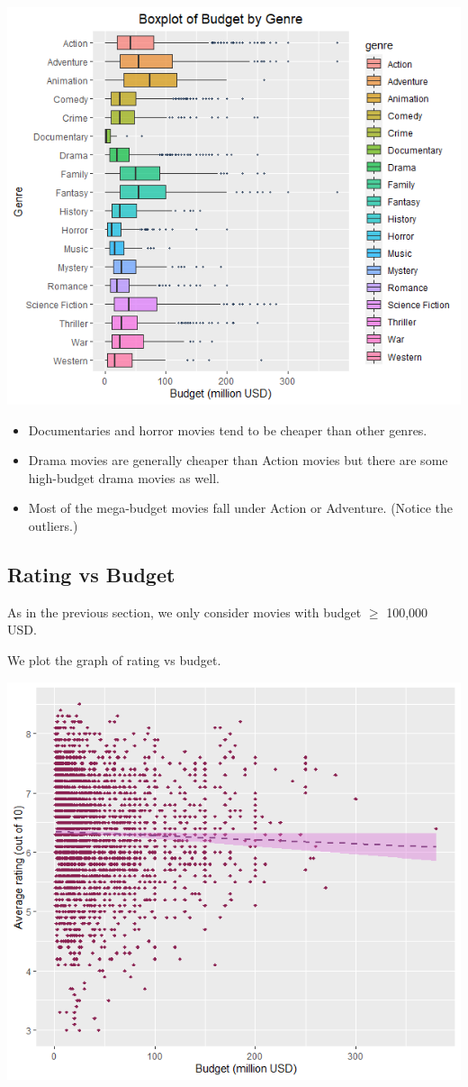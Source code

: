 \documentclass[10pt]{article}
\begin{document}
\begin{multicols}{2}
\includegraphics[scale=0.5]{boxplot_budget_genre.png}

\begin{itemize}
    \item Documentaries and horror movies tend to be cheaper than other genres.
    \item Drama movies are generally cheaper than Action movies but there are some high-budget drama movies as well.
    \item Most of the mega-budget movies fall under Action or Adventure. (Notice the outliers.)
\end{itemize}

\subsection{Rating vs Budget}

As in the previous section, we only consider movies with budget $\ge$ 100,000 USD.

We plot the graph of rating vs budget. 

\includegraphics[scale=0.5]{rating_vs_budget.png}


\end{multicols}
\end{document}

